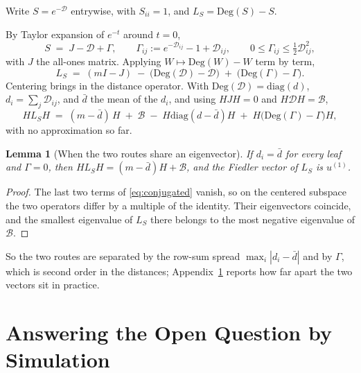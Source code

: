\documentclass[11pt]{article}
\newtheorem{lemma}{Lemma}
\begin{document}
Write $S = e^{-\mathcal{D}}$ entrywise, with $S_{ii} = 1$, and
$L_S = \mathrm{Deg}(S) - S$.

By Taylor expansion of $e^{-t}$ around $t=0$,
\begin{equation}
\label{eq:taylor}
S \;=\; J - \mathcal{D} + \Gamma, \qquad
\Gamma_{ij} := e^{-\mathcal{D}_{ij}} - 1 + \mathcal{D}_{ij}, \qquad
0 \le \Gamma_{ij} \le \tfrac{1}{2}\mathcal{D}_{ij}^2 ,
\end{equation}
with $J$ the all-ones matrix. Applying $W \mapsto \mathrm{Deg}(W) - W$ term by term,
\begin{equation}
\label{eq:LS-in-D}
L_S \;=\; (mI - J) \;-\; \big(\mathrm{Deg}(\mathcal{D}) - \mathcal{D}\big)
\;+\; \big(\mathrm{Deg}(\Gamma) - \Gamma\big) .
\end{equation}
Centering brings in the distance operator. With
$\mathrm{Deg}(\mathcal{D}) = \mathrm{diag}(d)$, $d_i = \sum_j \mathcal{D}_{ij}$, and
$\bar{d}$ the mean of the $d_i$, and using $HJH = 0$ and $H\mathcal{D}H = \mathcal{B}$,
\begin{equation}
\label{eq:conjugated}
H L_S H \;=\; (m - \bar{d})\,H \;+\; \mathcal{B}
\;-\; H \mathrm{diag}(d - \bar{d}) H
\;+\; H\big(\mathrm{Deg}(\Gamma) - \Gamma\big)H ,
\end{equation}
with no approximation so far.

\begin{lemma}[When the two routes share an eigenvector]
\label{lem:bridge}
If $d_i = \bar{d}$ for every leaf and $\Gamma = 0$, then
$H L_S H = (m - \bar{d})H + \mathcal{B}$, and the Fiedler vector of $L_S$ is $u^{(1)}$.
\end{lemma}

\begin{proof}
The last two terms of \eqref{eq:conjugated} vanish, so on the centered subspace the two
operators differ by a multiple of the identity. Their eigenvectors coincide, and the
smallest eigenvalue of $L_S$ there belongs to the most negative eigenvalue of
$\mathcal{B}$.
\end{proof}

So the two routes are separated by the row-sum spread $\max_i|d_i - \bar{d}|$ and by
$\Gamma$, which is second order in the distances;
Appendix~\ref{app:operators} reports how far apart the two vectors sit in practice.

\newpage



\newpage
\appendix

\section{Answering the Open Question by Simulation}
\label{app:operators}
\end{document}
